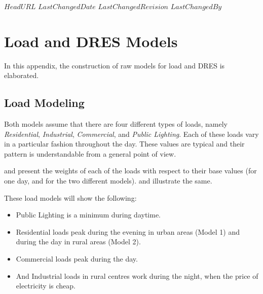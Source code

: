 \svnidlong
{$HeadURL$}
{$LastChangedDate$}
{$LastChangedRevision$}
{$LastChangedBy$}


\chapter{Load and DRES Models}

\begin{introduction}
In this appendix, the construction of raw models for load and DRES is elaborated.
\end{introduction}

\section{Load Modeling}

Both models assume that there are four different types of loads, namely \emph{Residential}, \emph{Industrial}, \emph{Commercial}, and \emph{Public Lighting}. Each of these loads vary in a particular fashion throughout the day. These values are typical and their pattern is understandable from a general point of view. 

 and  present the weights of each of the loads with respect to their base values (for one day, and for the two different models).  and  illustrate the same.

These load models will show the following:

\begin{itemize}
\item Public Lighting is a minimum during daytime.
\item Residential loads peak during the evening in urban areas (Model 1) and during the day in rural areas (Model 2).
\item Commercial loads peak during the day.
\item And Industrial loads in rural centres work during the night, when the price of electricity is cheap.
\end{itemize}

